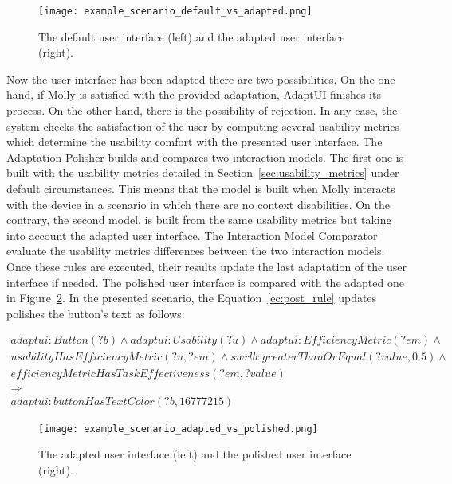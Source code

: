 \begin{figure}
\centering
\texttt{[image: example\_scenario\_default\_vs\_adapted.png]}
\caption{The default user interface (left) and the adapted user interface (right).}
\label{fig:example_scenario_default_vs_adapted}
\end{figure}


Now the user interface has been adapted there are two possibilities. On the one
hand, if Molly is satisfied with the provided adaptation, AdaptUI finishes its
process. On the other hand, there is the possibility of rejection. In any case,
the system checks the satisfaction of the user by computing several usability
metrics which determine the usability comfort with the presented user interface.
The Adaptation Polisher builds and compares two interaction models. The first 
one is built with the usability metrics detailed in 
Section~\ref{sec:usability_metrics} under default circumstances. This means that 
the model is built when Molly interacts with the device in a scenario in which
there are no context disabilities. On the contrary, the second model, is built 
from the same usability metrics but taking into account the adapted user interface. 
The Interaction Model Comparator evaluate the usability metrics differences
between the two interaction models. Once these rules are executed, their results 
update the last adaptation of the user interface if needed. The polished user 
interface is compared with the adapted one in 
Figure~\ref{fig:example_scenario_adapted_vs_polished}. In the presented scenario, 
the Equation~\ref{ec:post_rule} updates polishes the button's text as follows: 

\footnotesize
\begin{equation} \label{ec:post_rule} 
\begin{align*} 
adaptui:Button(?b) ∧ adaptui:Usability (?u) ∧ adaptui:EfficiencyMetric(?em) ∧ \\
usabilityHasEfficiencyMetric(?u, ?em) ∧ swrlb:greaterThanOrEqual(?value, 0.5) ∧ \\
efficiencyMetricHasTaskEffectiveness(?em, ?value)\\
\Rightarrow \\
adaptui:buttonHasTextColor(?b, 16777215)
\end{align*}
\end{equation}
\normalsize

\begin{figure}
\centering
\texttt{[image: example\_scenario\_adapted\_vs\_polished.png]}
\caption{The adapted user interface (left) and the polished user interface (right).}
\label{fig:example_scenario_adapted_vs_polished}
\end{figure}


